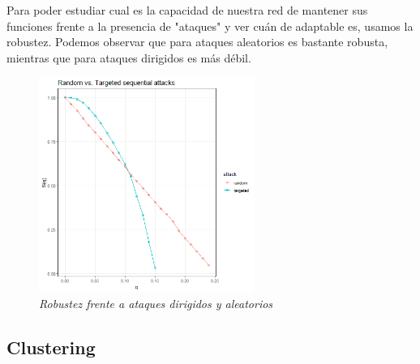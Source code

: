 Para poder estudiar cual es la capacidad de nuestra red de mantener sus funciones frente a la presencia de "ataques" y ver cuán de adaptable es, usamos la robustez. Podemos observar que para ataques aleatorios es bastante robusta, mientras que para ataques dirigidos es más débil. 
\begin{figure}
	\centering
		\includegraphics[width=70mm,scale=1.2]{figures/sequential_attacks.png}
		\caption{\textit{Robustez frente a ataques dirigidos y aleatorios}}
\end{figure}

\subsection{Clustering}




